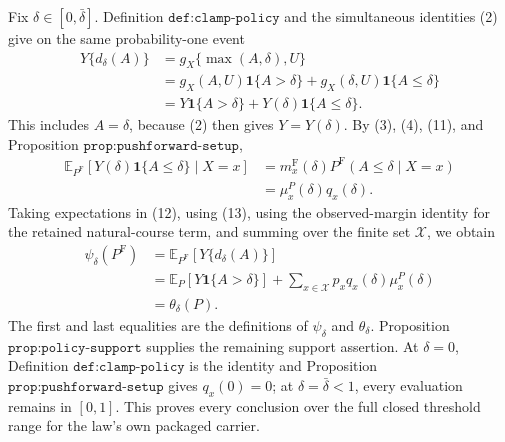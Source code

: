 Fix \(\delta\in[0,\bar\delta]\).  Definition \(\texttt{def:clamp-policy}\) and the simultaneous identities (2) give on the same probability-one event
\[
\begin{aligned}
 Y\{d_\delta(A)\}
 &=g_X\{\max(A,\delta),U\}\\
 &=g_X(A,U)\mathbf 1\{A>\delta\}
   +g_X(\delta,U)\mathbf 1\{A\leq\delta\}\\
 &=Y\mathbf 1\{A>\delta\}
   +Y(\delta)\mathbf 1\{A\leq\delta\}.
\end{aligned}
\tag{12}
\]
This includes \(A=\delta\), because (2) then gives \(Y=Y(\delta)\).  By (3), (4), (11), and Proposition \(\texttt{prop:pushforward-setup}\),
\[
\begin{aligned}
 \mathbb E_{P^{\mathrm F}}[Y(\delta)\mathbf 1\{A\leq\delta\}\mid X=x]
 &=m_x^{\mathrm F}(\delta)P^{\mathrm F}(A\leq\delta\mid X=x)\\
 &=\mu_x^P(\delta)q_x(\delta).
\end{aligned}
\tag{13}
\]
Taking expectations in (12), using (13), using the observed-margin identity for the retained natural-course term, and summing over the finite set \(\mathcal X\), we obtain
\[
\begin{aligned}
 \psi_\delta(P^{\mathrm F})
 &=\mathbb E_{P^{\mathrm F}}[Y\{d_\delta(A)\}]\\
 &=\mathbb E_P[Y\mathbf 1\{A>\delta\}]
   +\sum_{x\in\mathcal X}p_xq_x(\delta)\mu_x^P(\delta)\\
 &=\theta_\delta(P).
\end{aligned}
\tag{14}
\]
The first and last equalities are the definitions of \(\psi_\delta\) and \(\theta_\delta\).  Proposition \(\texttt{prop:policy-support}\) supplies the remaining support assertion.  At \(\delta=0\), Definition \(\texttt{def:clamp-policy}\) is the identity and Proposition \(\texttt{prop:pushforward-setup}\) gives \(q_x(0)=0\); at \(\delta=\bar\delta<1\), every evaluation remains in \([0,1]\).  This proves every conclusion over the full closed threshold range for the law's own packaged carrier.